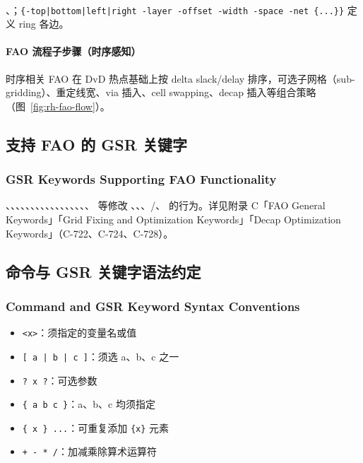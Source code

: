 \paragraph{}
、；\texttt{\{-top|bottom|left|right -layer -offset -width -space -net \{...\}\}} 定义 ring 各边。

\paragraph{FAO 流程子步骤（时序感知）}
时序相关 FAO 在 DvD 热点基础上按 delta slack/delay 排序，可选子网格（sub-gridding）、重定线宽、via 插入、cell swapping、decap 插入等组合策略（图~\ref{fig:rh-fao-flow}）。

\subsection{支持 FAO 的 GSR 关键字}
\subsubsection*{GSR Keywords Supporting FAO Functionality}

、、、、、、、、、、、、、、、、、 等修改 、、、/、 的行为。详见附录 C「FAO General Keywords」「Grid Fixing and Optimization Keywords」「Decap Optimization Keywords」（C-722、C-724、C-728）。

\subsection{命令与 GSR 关键字语法约定}
\subsubsection*{Command and GSR Keyword Syntax Conventions}

\begin{itemize}
  \item \texttt{<x>}：须指定的变量名或值
  \item \texttt{[ a | b | c ]}：须选 a、b、c 之一
  \item \texttt{? x ?}：可选参数
  \item \texttt{\{ a b c \}}：a、b、c 均须指定
  \item \texttt{\{ x \} ...}：可重复添加 \texttt{\{x\}} 元素
  \item \texttt{+ - * /}：加减乘除算术运算符
\end{itemize}

